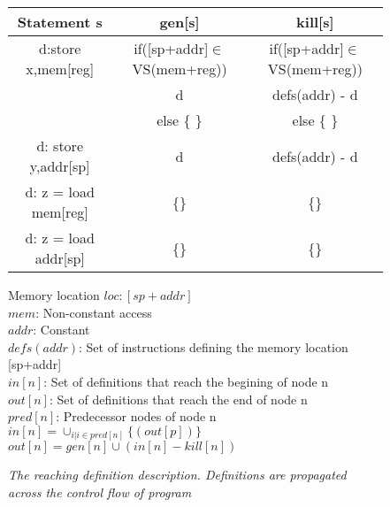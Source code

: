 
\begin{figure}[t]
{
\vspace{-0.2in}
\centering
{
\begin{scriptsize}
\begin{tabular}{|c|c|c|} %
\hline
\textbf{Statement s}&\textbf{gen[s]}&\textbf{kill[s]}\\ \hline
d:store x,mem[reg]&if([sp+addr]$\in$VS(mem+reg))&if([sp+addr]$\in$VS(mem+reg))\\	
					     &				d 	&				defs(addr) - {d}\\ 
					     &	else \{ \} 	&				else \{ \}\\ \hline
d: store y,addr[sp]&					d	&			defs(addr) - {d}\\ \hline
d: z = load mem[reg]& \{\}&  \{\}\\ \hline
d: z = load addr[sp]&\{\}&	\{\} \\ \hline
\end{tabular}
\begin{tabbing}
Memory location $loc: [sp + addr]$ \\
$mem$: Non-constant access\\
$addr$: Constant\\
$defs(addr)$: Set of instructions defining the memory location [sp+addr]\\
$in[n]$: Set of definitions that reach the begining of node n \\
$out[n]$: Set of definitions that reach  the end of node n \\
$pred[n]$: Predecessor nodes of node n\\
$in[n] = \cup_{i | i \in pred[n]}\{ (out[p])\}$ \\
$out[n] = gen[n] \cup (in[n] - kill[n])$
\end{tabbing}
\caption {\textit{The reaching definition description. Definitions are propagated across the control flow of program }}
\label{fig:reachingdef}
\end{scriptsize}
\vspace{-2ex}
}
}
\end{figure}
